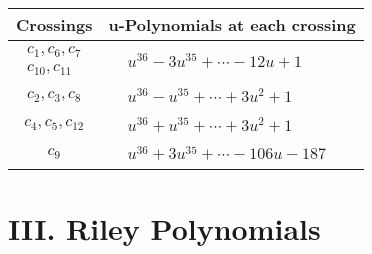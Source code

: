 \documentclass[1p]{elsarticle_modified}
\theoremstyle{definition}
\begin{document}
\begin{tabular}{m{50pt}|m{274pt}}
Crossings & \hspace{64pt}u-Polynomials at each crossing \\
\hline $$\begin{aligned}c_{1},c_{6},c_{7}\\c_{10},c_{11}\end{aligned}$$&$\begin{aligned}
&u^{36}-3 u^{35}+\cdots-12 u+1
\end{aligned}$\\
\hline $$\begin{aligned}c_{2},c_{3},c_{8}\end{aligned}$$&$\begin{aligned}
&u^{36}- u^{35}+\cdots+3 u^2+1
\end{aligned}$\\
\hline $$\begin{aligned}c_{4},c_{5},c_{12}\end{aligned}$$&$\begin{aligned}
&u^{36}+u^{35}+\cdots+3 u^2+1
\end{aligned}$\\
\hline $$\begin{aligned}c_{9}\end{aligned}$$&$\begin{aligned}
&u^{36}+3 u^{35}+\cdots-106 u-187
\end{aligned}$\\
\hline
\end{tabular}\newpage\renewcommand{\arraystretch}{1}
\centering \section*{ III. Riley Polynomials}
\end{document}
